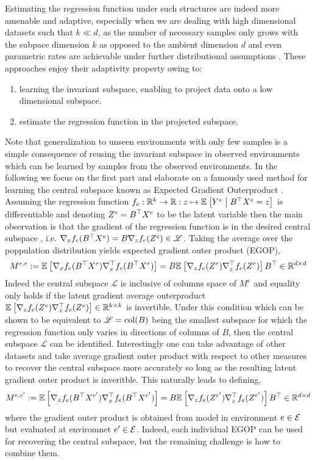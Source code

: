 Estimating the regression function under such structures are indeed more amenable and adaptive, especially when we are dealing with high dimensional datasets such that $k \ll d$, as the number of necessary samples only grows with the subpace dimension $k$ as opposed to the ambient dimension $d$ \citep{xia2002adaptive} 
and even parametric rates are achievable under further distributional assumptions \citep{yuan2023efficient}.
These approaches enjoy their adaptivity property owing to: 
\begin{enumerate}[label=(\roman*)]
    \item learning the invariant subspace, enabling to project data onto a low dimensional subspace.
    \item estimate the regression function in the projected subspace.
\end{enumerate}
Note that generalization to unseen environments with only few samples is a simple consequence of reusing the invariant subspace in observed environments which can be learned by samples from the observed environments.
In the following we focus on the first part and elaborate on a famously used method for learning the central subspace known as Expected Gradient Outerproduct \citep{li2018sufficient, hristache2001direct}. 
Assuming the regression function $f_e: \mathbb{R}^k \to \mathbb{R}: z \mapsto \mathbb{E}_{}\left[ Y^{e} \;\middle\vert\; B^{\top}X^{e} = z \right]$ is differentiable and denoting $Z^{e} = B^{\top} X^{e}$ to be the latent variable then the main observation is that the gradient of the regression function is in the desired central subspace
, i.e. $ \nabla_{x} f_e (B^{\top}X^{e}) = B \nabla_z f_e(Z^{e}) \in \mathscr{L}$. Taking the average over the poppulation distribution yields expected gradient outer product (EGOP),
$$ M^{e, e} := \mathbb{E}_{}\left[  \nabla_x f_e( B^{\top}X^{e}) \nabla_x^{\top} f_e( B^{\top} X^{e}  )  \right] = B \mathbb{E}_{}\left[  \nabla_z f_e( Z^{e}) \nabla_z^{\top} f_e( Z^{e}  )  \right] B^{\top} \in \mathbb{R}^{d \times d} $$
Indeed the central subspace $\mathscr{L}$ is inclusive of columns space of $M^{e}$ and equality only holds if the latent gradient average outerproduct $\mathbb{E}_{}\left[  \nabla_z f_e( Z^{e}) \nabla_z^{\top} f_e( Z^{e}  )  \right] \in \mathbb{R}^{k \times k}$ is invertible. 
Under this condition which can be shown to be equivalent to $\mathscr{L}= \operatorname{col}(B)$ being the smallest subspace for which the regression function only varies in directions of columns of $B$, then the central subspace $\mathscr{L}$ can be identified.
Interestingly one can take advantage of other datasets and take average gradient outer product with respect to other measures to recover the central subspace more accurately so long as the resulting latent gradient outer product is inveritble. 
This naturally leads to defining,
$$ M^{e, e'} := \mathbb{E}_{}\left[  \nabla_x f_e( B^{\top}X^{e'}) \nabla_x^{\top} f_e( B^{\top} X^{e'}  )  \right] = B \mathbb{E}_{}\left[  \nabla_z f_e( Z^{e'} ) \nabla_z^{\top} f_e( Z^{e'}  )  \right] B^{\top} \in \mathbb{R}^{d \times d}  $$
where the gradient outer product is obtained from model in environment $e \in \mathcal{E}$ but evaluated at enviromnet $e' \in \mathcal{E}$.
Indeed, each individual EGOP can be used for recovering the central subspace, but the remaining challenge is how to combine them.

